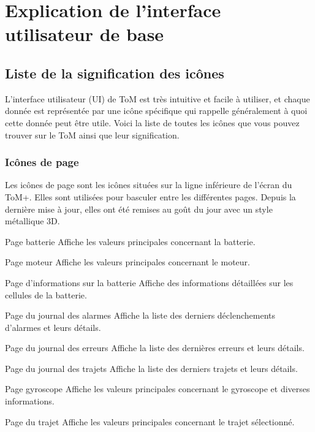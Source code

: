 \chapter{Explication de l'interface utilisateur de base}

\section{Liste de la signification des icônes}
\label{sec:icon_list}

L'interface utilisateur (UI) de ToM est très intuitive et facile à utiliser, et chaque donnée est représentée par une icône spécifique qui rappelle généralement à quoi cette donnée peut être utile. Voici la liste de toutes les icônes que vous pouvez trouver sur le ToM ainsi que leur signification.

\subsection{Icônes de page}
\label{sec:page_icon_list}

Les icônes de page sont les icônes situées sur la ligne inférieure de l'écran du ToM+. Elles sont utilisées pour basculer entre les différentes pages. Depuis la dernière mise à jour, elles ont été remises au goût du jour avec un style métallique 3D.

{Page batterie}
{Affiche les valeurs principales concernant la batterie.}

{Page moteur}
{Affiche les valeurs principales concernant le moteur.}

{Page d'informations sur la batterie}
{Affiche des informations détaillées sur les cellules de la batterie.}

{Page du journal des alarmes}
{Affiche la liste des derniers déclenchements d'alarmes et leurs détails.}

{Page du journal des erreurs}
{Affiche la liste des dernières erreurs et leurs détails.}

{Page du journal des trajets}
{Affiche la liste des derniers trajets et leurs détails.}

{Page gyroscope}
{Affiche les valeurs principales concernant le gyroscope et diverses informations.}

{Page du trajet}
{Affiche les valeurs principales concernant le trajet sélectionné.}


